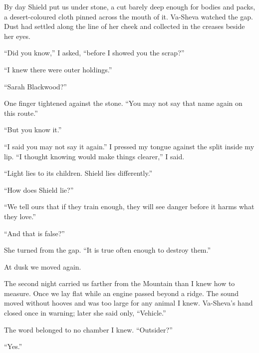 By day Shield put us under stone, a cut barely deep enough for bodies and packs, a desert-coloured cloth pinned across the mouth of it. Va-Sheva watched the gap. Dust had settled along the line of her cheek and collected in the creases beside her eyes.\par

``Did you know,'' I asked, ``before I showed you the scrap?''\par

``I knew there were outer holdings.''\par

``Sarah Blackwood?''\par

One finger tightened against the stone. ``You may not say that name again on this route.''\par

``But you know it.''\par

``I said you may not say it again.'' I pressed my tongue against the split inside my lip. ``I thought knowing would make things clearer,'' I said.\par

``Light lies to its children. Shield lies differently.''\par

``How does Shield lie?''\par

``We tell ours that if they train enough, they will see danger before it harms what they love.''\par

``And that is false?''\par

She turned from the gap. ``It is true often enough to destroy them.''\par

At dusk we moved again.\par

The second night carried us farther from the Mountain than I knew how to measure. Once we lay flat while an engine passed beyond a ridge. The sound moved without hooves and was too large for any animal I knew. Va-Sheva's hand closed once in warning; later she said only, ``Vehicle.''\par

The word belonged to no chamber I knew. ``Outsider?''\par

``Yes.''\par

